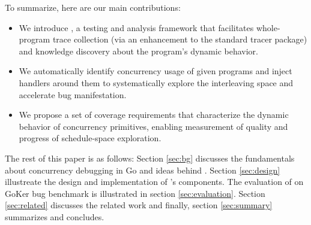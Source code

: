 To summarize, here are our main contributions:
\begin{itemize}
    \item We introduce \goat, a testing and analysis framework that facilitates whole-program trace collection (via an enhancement to the standard tracer package) and knowledge discovery about the program's dynamic behavior.
    \item We automatically identify concurrency usage of given programs and inject handlers around them to systematically explore the interleaving space and accelerate bug manifestation.
    \item We propose a set of coverage requirements that characterize the dynamic behavior of concurrency primitives, enabling measurement of quality and progress of schedule-space exploration.
\end{itemize}

The rest of this paper is as follows: Section \ref{sec:bg} discusses the fundamentals about concurrency debugging in Go and ideas behind \goat. Section \ref{sec:design} illustreate the design and implementation of \goat's components. The evaluation of \goat on GoKer bug benchmark is illustrated in section \ref{sec:evaluation}. Section \ref{sec:related} discusses the related work and finally, section \ref{sec:summary} summarizes and concludes.

